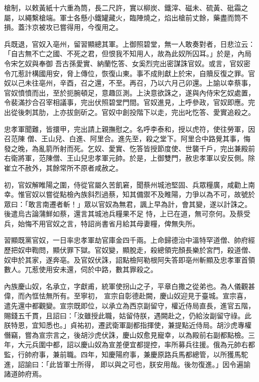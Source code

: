 \begin{pinyinscope}
 槍制，以敕黃紙十六重為筒，長二尺許，實以柳炭、鐵滓、磁未、硫黃、砒霜之屬，以繩繫槍端。軍士各懸小鐵罐藏火，臨陣燒之，焰出槍前丈餘，藥盡而筒不損。蓋汴京被攻已嘗得用，今復用之。



 兵既退，官奴入亳州，留習顯總其軍。上御照碧堂，無一人敢奏對者，日悲泣云：「自古無不亡之國、不死之君，但恨我不知用人，故為此奴所囚耳。」於是，內局令宋乞奴與奉御
 吾古孫愛實、納蘭忔答、女奚烈完出密謀誅官奴。或言，官奴密令兀惹計構國用安，脅上傳位，恢復山東。事不成則獻上於宋，自贖反復之罪。官奴以己未往亳州，辛酉，召之還，不至。再召，乃以六月己卯還。上諭以幸蔡事，官奴憤憤而出，至於扼腕頓足，意趣叵測。上決意欲誅之，遂與內侍宋乞奴處置，令裴滿抄合召宰相議事，完出伏照碧堂門間。官奴進見，上呼參政，官奴即應。完出從後刺其肋，上亦拔劍斫之。官奴中創投階下以走，完出叱忔答、愛實追殺之。



 忠孝軍聞難，皆擐甲，完出請上親撫慰之。名呼李泰和，授以虎符，使往勞軍，因召范陳
 僧、王山兒、白進、阿里合。進先至，殺之堂下。阿里合中路覺其事，悔發之晚，為亂箭所射而死。乞奴、愛實、忔答皆授節度使、世襲千戶，完出兼殿前右衛將軍，范陳僧、王山兒忠孝軍元帥。於是，上御雙門，赦忠孝軍以安反側。除崔立不赦外，其餘常所不原者咸赦之。



 初，官奴解睢陽之圍，侍從官屬久苦飢窘，聞蔡州城池堅固、兵眾糧廣，咸勸上南幸。惟官奴以嘗從點檢內族斜烈過蔡，知其備禦不及睢陽，力爭以為不可，故號於眾曰：「敢言南遷者斬！」眾以官奴為無君，諷上早為計，會其變，遂以計誅之。後遣烏古論蒲鮮如蔡，還言其城池兵糧果不足
 恃，上已在道，無可奈何。及蔡受兵，始悔不用官奴之言，特詔尚書省月給其母妻糧，俾無失所。



 習顯既黨官奴，一日率忠孝軍劫官庫金四千兩。上命歸德治中溫特罕道僧、帥府經歷把奴申鞫問，顯伏罪下獄。官奴變，顯脫走，殺總領完顏長樂於宮門，殺道僧、奴申於其家，遂奔亳。及官奴伏誅，詔點檢阿勒根阿失答即亳州斬顯及忠孝軍首領數人。兀惹使用安未還，伺於中路，數其罪殺之。



 內族慶山奴，名承立，字獻甫，統軍使拐山之子，平章白撒之從弟也。為人儀觀甚偉，而內恇怯無所有。至寧初，
 宣宗自彰德赴闕，慶山奴迎見于臺城。宣宗喜，遣先還中都觀變。宣宗既即位，以承立為西京副留守，權近侍局直長，進官五階，賜錢五千貫，且詔曰：「汝雖授此職，姑留侍朕，遇闕赴之，仍給汝副留守祿。此朕特恩，宜知悉也。」貞祐初，遷武衛軍副都指揮使，兼提點近侍局。胡沙虎專權僭竊，嘗為宣宗言之，後胡沙虎伏誅，慶山奴愈見寵幸，以為殿前右副都點檢。三年，大元兵圍中都，詔以慶山奴為宣差便宜都提控，率所募兵往援。俄為元帥右都監，行帥府事，兼前職。四年，知慶陽府事，兼慶原路兵馬都總管，以所獲馬駝進，詔諭曰：「此皆軍士所得，
 即以與之可也，朕安用哉。後勿復進。」因令遍諭諸道帥府焉。




\end{pinyinscope}
